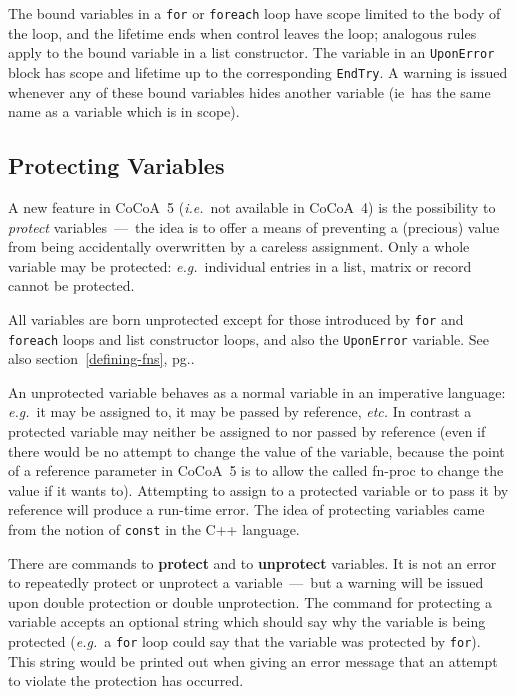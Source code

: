 \documentclass{book}[12,a4paper]
\def\ie{{\it i.e.}}
\def\eg{{\it e.g.}}
\def\refandpage#1{{\ref{#1}, pg.\pageref{#1}}}
\begin{document}
The bound variables in a \texttt{for} or \texttt{foreach} loop have scope
limited to the body of the loop, and the lifetime ends when control leaves
the loop; analogous rules apply to the bound variable in a list constructor.
The variable in an \texttt{UponError} block has scope and lifetime up to
the corresponding \texttt{EndTry}.    A warning
is issued whenever any of these bound variables hides another variable
(ie~has the same name as a variable which is in scope).


\subsection{Protecting Variables}


A new feature in CoCoA~5 (\ie~not available in CoCoA~4) is the possibility
to \textit{protect} variables~---~the idea is to offer a means of
preventing a (precious) value from being accidentally overwritten by a
careless assignment.  Only a whole variable may be protected:
\eg~individual entries in a list, matrix or record cannot be protected.

All variables are born unprotected except for those introduced by
\texttt{for} and \texttt{foreach} loops and list constructor loops, and also the
\texttt{UponError} variable.  See also section~\refandpage{defining-fns}.

An unprotected variable behaves as a normal variable in an imperative
language: \eg~it may be assigned to, it may be passed by reference,
\textit{etc.}  In contrast a protected variable may neither be assigned to
nor passed by reference (even if there would be no attempt to change the
value of the variable, because the point of a reference parameter in
CoCoA~5 is to allow the called fn-proc to change the value if it wants to).
Attempting to assign to a protected variable or to pass it by reference
will produce a run-time error.  The idea of protecting variables came from
the notion of \texttt{const} in the C++ language.

There are commands to \textbf{protect} and to \textbf{unprotect} variables.
It is not an error to repeatedly protect or unprotect a
variable~---~but a warning will be issued upon double protection or double
unprotection.  The command for protecting a variable accepts an optional
string which should say why the variable is being protected (\eg~a
\texttt{for} loop could say that the variable was protected by \texttt{for}).
This string would be printed out when giving an error message that an
attempt to violate the protection has occurred.
\end{document}
